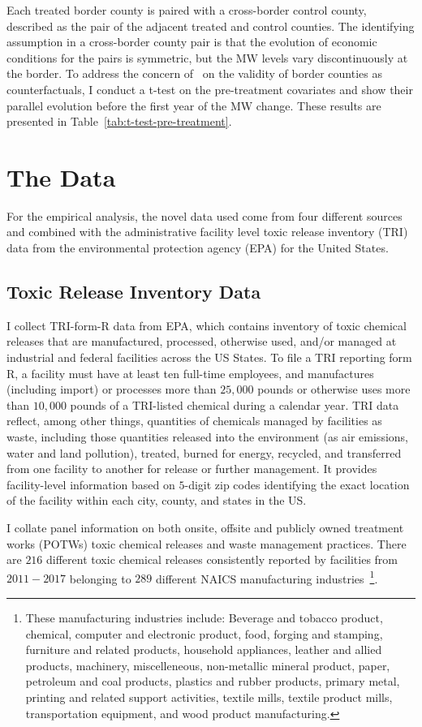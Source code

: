 \documentclass[12pt, english]{article}
\begin{document}
    
    
    Each treated border county is paired with a cross-border control county, described as the pair of the adjacent treated and control counties. The identifying assumption in a cross-border county pair is that the evolution of economic conditions for the pairs is symmetric, but the MW levels vary discontinuously at the border. To address the concern of~\cite{neumark2014revisiting} on the validity of border counties as counterfactuals, I conduct a t-test on the pre-treatment covariates and show their parallel evolution before the first year of the MW change. These results are presented in Table~\ref{tab:t-test-pre-treatment}.


    \section{The Data}\label{sec:data-and-methods}
    For the empirical analysis, the novel data used come from four different sources and combined with the administrative facility level toxic release inventory (TRI) data from the environmental protection agency (EPA) for the United States.

    \subsection{Toxic Release Inventory Data}\label{subsec:toxic-release-inventory-data}
    I collect TRI-form-R data from EPA, which contains inventory of toxic chemical releases that are manufactured, processed, otherwise used, and/or managed at industrial and federal facilities across the US States. To file a TRI reporting form R, a facility must have at least ten full-time employees, and manufactures (including import) or processes more than $25,000$ pounds or otherwise uses more than $10,000$ pounds of a TRI-listed chemical during a calendar year. TRI data reflect, among other things, quantities of chemicals managed by facilities as waste, including those quantities released into the environment (as air emissions, water and land pollution), treated, burned for energy, recycled, and transferred from one facility to another for release or further management. It provides facility-level information based on $5$-digit zip codes identifying the exact location of the facility within each city, county, and states in the US.

    I collate panel information on both onsite, offsite and publicly owned treatment works (POTWs) toxic chemical releases and waste management practices. There are $216$ different toxic chemical releases consistently reported by facilities from $2011-2017$ belonging to $289$ different NAICS manufacturing industries~\footnote{\tiny These manufacturing industries include: Beverage and tobacco product, chemical, computer and electronic product, food, forging and stamping, furniture and related products, household appliances, leather and allied products, machinery, miscelleneous, non-metallic mineral product, paper, petroleum and coal products, plastics and rubber products, primary metal, printing and related support activities, textile mills, textile product mills, transportation equipment, and wood product manufacturing.}.
\end{document}
